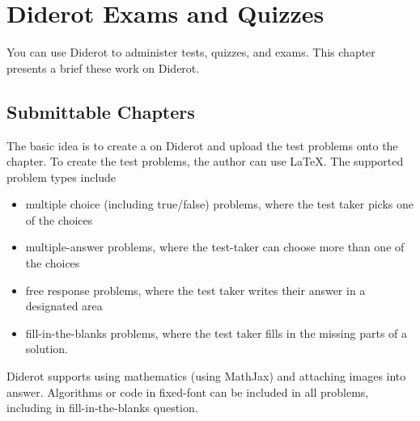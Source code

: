 \chapter{Diderot Exams and Quizzes}
\label{ch:quiz}

\begin{cluster}
\label{grp:prmbl:quiz::diderot}

\begin{preamble}
\label{prmbl:quiz::diderot}
You can use Diderot to administer tests, quizzes, and exams.  This chapter presents a brief these work on Diderot.

\end{preamble}
\end{cluster}


\section{Submittable Chapters}
\label{sec:quiz::submittable-chapters}

\begin{cluster}
\label{grp:grm:quiz::basic}

\begin{gram}
\label{grm:quiz::basic}
The basic idea is to create a  on Diderot and upload the test problems onto the chapter.  To create the test problems, the author can use LaTeX.  The supported problem types include
\begin{itemize}
\item multiple choice (including true/false) problems, where the test taker picks one of the
  choices
\item multiple-answer problems, where the test-taker can choose more than one of the choices
\item free response problems, where the test taker writes their answer in a designated area
\item fill-in-the-blanks problems, where the test taker fills in the missing parts of a solution.
\end{itemize}

\end{gram}
\end{cluster}

\begin{cluster}
\label{grp:grm:quiz::diderot}

\begin{gram}
\label{grm:quiz::diderot}
Diderot supports using mathematics (using MathJax) and attaching images into answer.  Algorithms or code in fixed-font can be included in all problems, including in fill-in-the-blanks question.

\end{gram}
\end{cluster}


